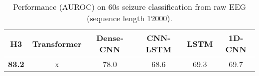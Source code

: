 \begin{table}[h]
    \small
    \centering
    \caption{\label{table:eeg} Performance (AUROC) on 60s seizure classification from raw EEG (sequence length 12000).}
    {
        \begin{tabular}{@{}|cccccc|@{}}
        \hline
        H3 & Transformer  & Dense-CNN & CNN-LSTM & LSTM & 1D-CNN  \\ %
        \hline
        \textbf{83.2} & x  & 78.0 & 68.6 & 69.3 & 69.7 \\
        \hline
        \end{tabular}
    }
\end{table}